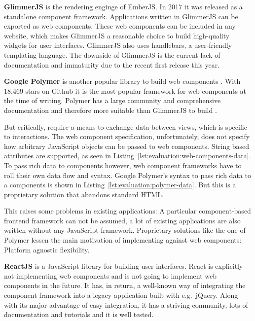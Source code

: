 \textbf{GlimmerJS} is the rendering enginge of EmberJS\cite{Ember2017}.
In 2017 it was released as a standalone component framework.
Applications written in GlimmerJS can be exported as web components.
These web components can be included in any website, which makes GlimmerJS a reasonable choice to build high-quality widgets for user interfaces.
GlimmerJS also uses handlebars\cite{Handlebars2017}, a user-friendly templating language.
The downside of GlimmerJS is the current lack of documentation and immaturity due to the recent first release this year.

\textbf{Google Polymer} is another popular library to build web components \cite{Polymer2017}.
With 18,469 stars on Github it is the most popular framework for web components at the time of writing.
Polymer has a large community and comprehensive documentation and therefore more suitable than GlimmerJS to build \cmvs{}.

But critically, \cmvs{} require a means to exchange data between views, which is specific to interactions.
The web component specification, unfortunately, does not specify how arbitrary JavaScript objects can be passed to web components.
String based attributes are supported, as seen in Listing~\ref{lst:evaluation:web-components-data}.
To pass rich data to components however, web component frameworks have to roll their own data flow and syntax.
Google Polymer's syntax to pass rich data to a components is shown in Listing~\ref{lst:evaluation:polymer-data}.
But this is a proprietary solution that abandons standard HTML.





This raises some problems in existing applications:
A particular component-based frontend framework can not be assumed, a lot of existing applications are also written without any JavaScript framework.
Proprietary solutions like the one of Polymer lessen the main motivation of implementing against web components:
Platform agnostic flexibility.

\textbf{ReactJS} is a JavaScript library for building user interfaces\cite{React2017}.
React is explicitly not implementing web components and is not going to implement web components in the future.
It has, in return, a well-known way of integrating the component framework into a legacy application built with e.g.\ jQuery.
Along with its major advantage of easy integration, it has a striving community, lots of documentation and tutorials and it is well tested.

